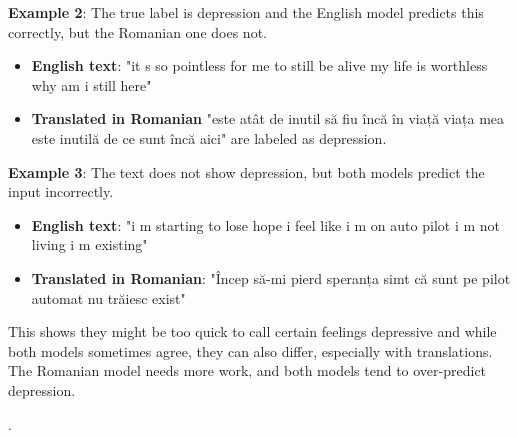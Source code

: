 \textbf{Example 2}: The true label is depression and the English model predicts this correctly, but the Romanian one does not.

\begin{itemize}
    \item \textbf{English text}: "it s so pointless for me to still be alive my life is worthless why am i still here" 
    
    \item \textbf{Translated in Romanian} "este atât de inutil să fiu încă în viață viața mea este inutilă de ce sunt încă aici" are labeled as depression. 

\end{itemize}

\textbf{Example 3}: The text does not show depression, but  both models predict the input incorrectly.

\begin{itemize}
    \item \textbf{English text}: "i m starting to lose hope i feel like i m on auto pilot i m not living i m existing" 
    
    \item \textbf{Translated in Romanian}: "Încep să-mi pierd speranța simt că sunt pe pilot automat nu trăiesc exist"
\end{itemize}

This shows they might be too quick to call certain feelings depressive and while both models sometimes agree, they can also differ, especially with translations. The Romanian model needs more work, and both models tend to over-predict depression.






.


